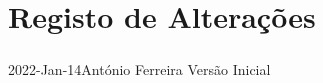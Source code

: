 \chapter*{Registo de Alterações}
\paragraph{}

\begin{logentry}{2022-Jan-14}{António Ferreira}
Versão Inicial
\end{logentry}